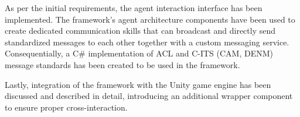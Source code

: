 \documentclass[main.tex]{subfiles}
\begin{document}
As per the initial requirements, the agent interaction interface has been implemented. The framework's agent 
architecture components have been used to create dedicated communication skills that can broadcast and 
directly send standardized messages to each other together with a custom messaging service.
Consequentially, a C\# implementation of ACL and C-ITS (CAM, DENM) message standards has been created to
be used in the framework. 

Lastly, integration of the framework with the Unity game engine has been discussed and described in detail, 
introducing an additional wrapper component to ensure proper cross-interaction.

\clearpage
\end{document}
